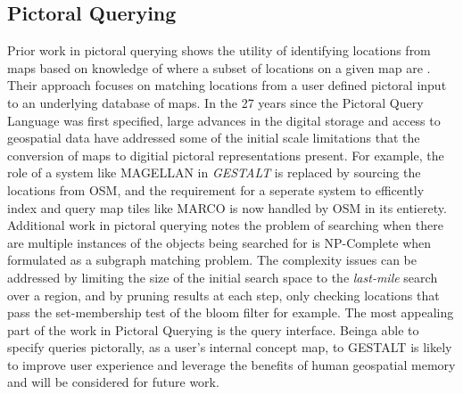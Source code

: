 \subsection{Pictoral Querying}
Prior work in pictoral querying shows the utility of identifying locations from maps based on knowledge of where a subset of locations on a given map are \cite{Soffer1996}. 
Their approach focuses on matching locations from a user defined pictoral input to an underlying database of maps. In the 27 years since the Pictoral Query Language was first specified, large advances in the digital storage and access to geospatial data have addressed some of the initial scale limitations that the conversion of maps to digitial pictoral representations present. For example, the role of a system like MAGELLAN \cite{Samet1998} in \textit{GESTALT} is replaced by sourcing the locations from OSM, and the requirement for a seperate system to efficently index and query map tiles like MARCO \cite{Samet1996} is now handled by OSM in its entierety. 
Additional work in pictoral querying notes the problem of searching when there are multiple instances of the objects being searched for is NP-Complete when formulated as a subgraph matching problem\cite{Folkers2000}. 
The complexity issues can be addressed by limiting the size of the initial search space to the \textit{last-mile} search over a region, and by pruning results at each step, only checking locations that pass the set-membership test of the bloom filter for example. 
The most appealing part of the work in Pictoral Querying is the query interface. Beinga able to specify queries pictorally, as a user's internal concept map, to GESTALT is likely to improve user experience and leverage the benefits of human geospatial memory and will be considered for future work. 